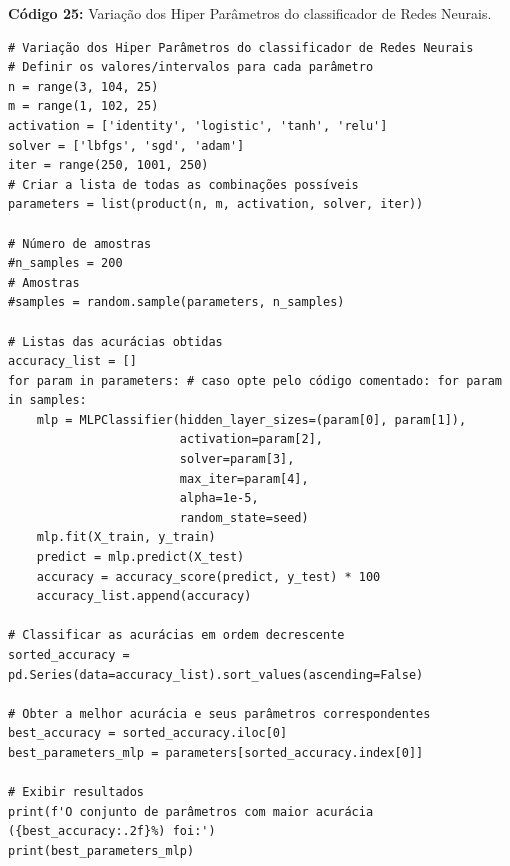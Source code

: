 \documentclass[a4paper,12pt]{article} %
\begin{document}
\begin{center}
\textbf{Código 25:} Variação dos Hiper Parâmetros do classificador de Redes Neurais.
\begin{verbatim}
# Variação dos Hiper Parâmetros do classificador de Redes Neurais
# Definir os valores/intervalos para cada parâmetro
n = range(3, 104, 25)
m = range(1, 102, 25)
activation = ['identity', 'logistic', 'tanh', 'relu']
solver = ['lbfgs', 'sgd', 'adam']
iter = range(250, 1001, 250)
# Criar a lista de todas as combinações possíveis
parameters = list(product(n, m, activation, solver, iter))

# Número de amostras
#n_samples = 200
# Amostras
#samples = random.sample(parameters, n_samples)

# Listas das acurácias obtidas
accuracy_list = []
for param in parameters: # caso opte pelo código comentado: for param in samples:
    mlp = MLPClassifier(hidden_layer_sizes=(param[0], param[1]),
                        activation=param[2],
                        solver=param[3],
                        max_iter=param[4],
                        alpha=1e-5,
                        random_state=seed)
    mlp.fit(X_train, y_train)
    predict = mlp.predict(X_test)
    accuracy = accuracy_score(predict, y_test) * 100
    accuracy_list.append(accuracy)

# Classificar as acurácias em ordem decrescente
sorted_accuracy = pd.Series(data=accuracy_list).sort_values(ascending=False)

# Obter a melhor acurácia e seus parâmetros correspondentes
best_accuracy = sorted_accuracy.iloc[0]
best_parameters_mlp = parameters[sorted_accuracy.index[0]]

# Exibir resultados
print(f'O conjunto de parâmetros com maior acurácia ({best_accuracy:.2f}%) foi:')
print(best_parameters_mlp)
\end{verbatim}
\end{center}
\end{document}
